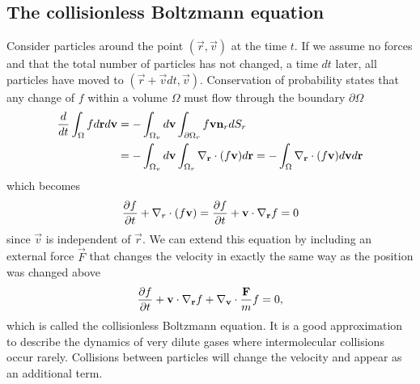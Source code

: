 \subsection{The collisionless Boltzmann equation}
Consider particles around the point $(\vec r,\vec v)$ at the time $t$. If we assume no forces and that the total number of particles has not changed, a time $dt$ later, all particles have moved to $(\vec r + \vec vdt, \vec v)$. Conservation of probability states that any change of $f$ within a volume $\Omega$ must flow through the boundary $\partial \Omega$
\begin{align}
	{d\over dt}\int_\Omega f d\vec r d\vec v &= -\int_{\Omega_v}d\vec v\int_{\partial \Omega_r} f\vec v \vec n_r dS_r\\
	&= -\int_{\Omega_v}d\vec v\int_{\Omega_r} \nabla_\vec r\cdot(f\vec v) d\vec r = -\int_{\Omega} \nabla_\vec r\cdot(f\vec v) d\vec vd\vec r
\end{align}
which becomes
\begin{align}
	\dpart{f}{t} + \nabla_r \cdot(f\vec v) = \dpart{f}{t} + \vec v\cdot\nabla_\vec r f = 0
\end{align}
since $\vec v$ is independent of $\vec r$. We can extend this equation by including an external force $\vec F$ that changes the velocity in exactly the same way as the position was changed above
\begin{align}
	\label{eq:collisionless_boltzmann}
	\dpart{f}{t} + \vec v\cdot\nabla_\vec r f + \nabla_\vec v \cdot {\vec F\over m}f = 0,
\end{align}
which is called the collisionless Boltzmann equation. It is a good approximation to describe the dynamics of very dilute gases where intermolecular collisions occur rarely. Collisions between particles will change the velocity and appear as an additional term.
